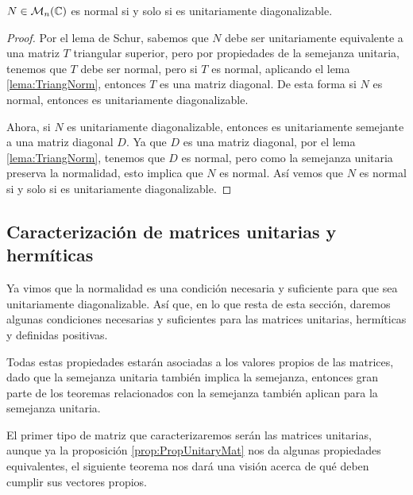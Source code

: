 \begin{teor}\label{teor:CaracMatNorm}
  $N \in \mathcal{M}_n(\mathbb{C})$ es normal si y solo si es unitariamente diagonalizable.
\end{teor}
\begin{proof}
  Por el lema de Schur, sabemos que $N$ debe ser unitariamente equivalente a una matriz $T$ triangular superior, pero por propiedades de la semejanza unitaria, tenemos que $T$ debe ser normal, pero si $T$ es normal, aplicando el lema \ref{lema:TriangNorm}, entonces $T$ es una matriz diagonal. De esta forma si $N$ es normal, entonces es unitariamente diagonalizable.

  Ahora, si $N$ es unitariamente diagonalizable, entonces es unitariamente semejante a una matriz diagonal $D$. Ya que $D$ es una matriz diagonal, por el lema \ref{lema:TriangNorm}, tenemos que $D$ es normal, pero como la semejanza unitaria preserva la normalidad, esto implica que $N$ es normal. Así vemos que $N$ es normal si y solo si es unitariamente diagonalizable.
\end{proof}


\subsection{Caracterización de matrices unitarias y hermíticas}

Ya vimos que la normalidad es una condición necesaria y suficiente para que sea unitariamente diagonalizable. Así que, en lo que resta de esta sección, daremos algunas condiciones necesarias y suficientes para las matrices unitarias, hermíticas y definidas positivas.

Todas estas propiedades estarán asociadas a los valores propios de las matrices, dado que la semejanza unitaria también implica la semejanza, entonces gran parte de los teoremas relacionados con la semejanza también aplican para la semejanza unitaria.

El primer tipo de matriz que caracterizaremos serán las matrices unitarias, aunque ya la proposición \ref{prop:PropUnitaryMat} nos da algunas propiedades equivalentes, el siguiente teorema nos dará una visión acerca de qué deben cumplir sus vectores propios.

